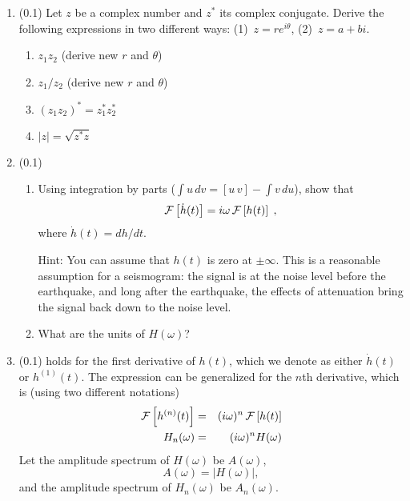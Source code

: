 \documentclass[11pt,titlepage,fleqn]{article}
\newcommand{\fft}{h}
\newcommand{\ffw}{H}
\begin{document}
\begin{enumerate}

\item (0.1) Let $z$ be a complex number and $z^*$ its complex conjugate. Derive the following expressions in two different ways: (1)~$z = r e^{i\theta}$, (2)~$z = a+bi$.
%
\begin{enumerate}
\item $z_1 z_2$ (derive new $r$ and $\theta$)
\item $z_1 / z_2$ (derive new $r$ and $\theta$)
\item $(z_1 z_2)^* = z_1^* z_2^*$
\item $|z| = \sqrt{z^* z}$
\end{enumerate}


\item (0.1)

\begin{enumerate}
\item Using integration by parts ($\int u\,dv = [u\,v] - \int v\,du$), show that 
%
\begin{eqnarray}
\cF \left[ \dot{\fft}(t) \right] = i\omega \, \cF \left[ \fft(t) \right]
\label{fftder1}
\;,
\end{eqnarray}
%
where $\dot{\fft}(t) = d\fft/dt$.

Hint: You can assume that $h(t)$ is zero at $\pm\infty$. This is a reasonable assumption for a seismogram: the signal is at the noise level before the earthquake, and long after the earthquake, the effects of attenuation bring the signal back down to the noise level.

\item What are the units of $\ffw(\omega)$?
\end{enumerate}


\item (0.1)  holds for the first derivative of $\fft(t)$, which we denote as either $\dot{\fft}(t)$ or $\fft^{(1)}(t)$. The expression can be generalized for the $n$th derivative, which is (using two different notations)
%
\begin{eqnarray}
\cF \left[ \fft^{(n)}(t) \right] &=& (i\omega)^n \, \cF \left[ \fft(t) \right]
\\
\ffw_n(\omega) &=& (i\omega)^n \ffw(\omega)
\label{fftnder}
\end{eqnarray}
%
Let the amplitude spectrum of $\ffw(\omega)$ be $A(\omega)$,
%
\begin{equation}
A(\omega) = |\ffw(\omega)|,
\end{equation}
%
and the amplitude spectrum of $\ffw_n(\omega)$ be $A_n(\omega)$.


\end{enumerate}
\end{document}

